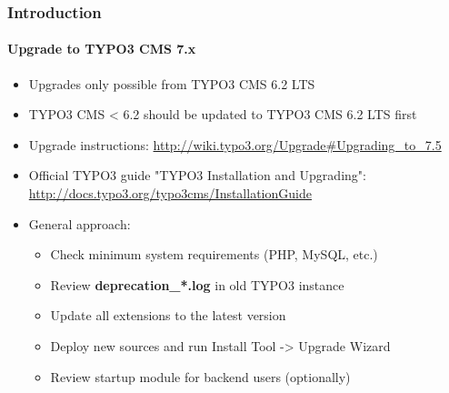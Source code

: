 \begin{frame}[fragile]
	\frametitle{Introduction}
	\framesubtitle{Upgrade to TYPO3 CMS 7.x}

	\begin{itemize}
		\item Upgrades only possible from TYPO3 CMS 6.2 LTS
		\item TYPO3 CMS < 6.2 should be updated to TYPO3 CMS 6.2 LTS first
	\end{itemize}

	\begin{itemize}

		\item Upgrade instructions:\newline
			\smaller\url{http://wiki.typo3.org/Upgrade#Upgrading_to_7.5}\normalsize
		\item Official TYPO3 guide "TYPO3 Installation and Upgrading":
			\smaller\url{http://docs.typo3.org/typo3cms/InstallationGuide}\normalsize
		\item General approach:
			\begin{itemize}
				\item Check minimum system requirements \small(PHP, MySQL, etc.)
				\item Review \textbf{deprecation\_*.log} in old TYPO3 instance
				\item Update all extensions to the latest version
				\item Deploy new sources and run Install Tool -> Upgrade Wizard
				\item Review startup module for backend users (optionally)
			\end{itemize}
	\end{itemize}

\end{frame}

